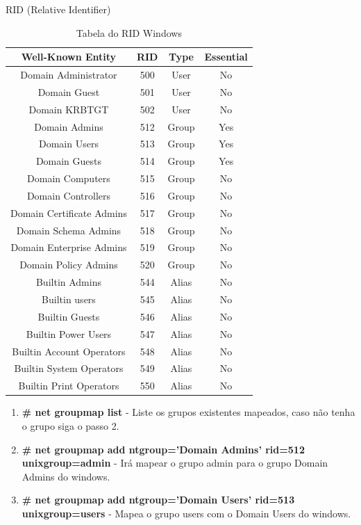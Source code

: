 RID (Relative Identifier) 
\begin{table}
	\centering
	\caption{Tabela do RID Windows \cite{RID}}
	\begin{tabular}{cccc}
		
		\hline
		
		Well-Known Entity & RID & Type &	Essential \\
		
		\hline
		
		\hline
		
		Domain Administrator & 500 & User & No \\
		Domain Guest & 501 & User & No \\		
		Domain KRBTGT & 502	& User & No \\
		Domain Admins & 512 & Group & Yes \\
		Domain Users & 513 & Group & Yes \\
		Domain Guests & 514 & Group & Yes \\
		Domain Computers & 515 & Group & No \\
		Domain Controllers & 516 & Group & No \\
		Domain Certificate Admins & 517 & Group & No \\
		Domain Schema Admins & 518 & Group & No \\		
		Domain Enterprise Admins & 519 & Group & No \\
		Domain Policy Admins & 520 & Group & No \\
		Builtin Admins & 544 & Alias & No \\
		Builtin users & 545 & Alias & No \\
		Builtin Guests & 546 & Alias & No \\
		Builtin Power Users & 547 & Alias & No \\
		Builtin Account Operators & 548 & Alias & No \\
		Builtin System Operators & 549 & Alias & No \\
		Builtin Print Operators	& 550 & Alias & No \\
		 	
		\hline
	\end{tabular}
	\label{tab}
\end{table}
\begin{enumerate}
	\item \textbf{\# net groupmap list} - Liste os grupos existentes mapeados, caso não tenha o grupo siga o passo 2.		
	\item \textbf{\# net groupmap add ntgroup='Domain Admins' rid=512 unixgroup=admin} - Irá mapear o grupo admin para o grupo Domain Admins do windows.
	\item \textbf{\# net groupmap add ntgroup='Domain Users' rid=513 unixgroup=users} - Mapea o grupo users com o Domain Users do windows.
\end{enumerate}

